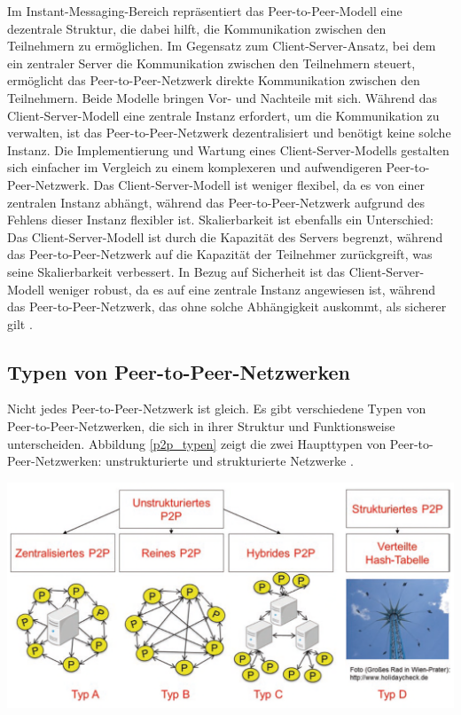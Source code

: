 Im Instant-Messaging-Bereich repräsentiert das Peer-to-Peer-Modell eine dezentrale Struktur, die dabei hilft, die Kommunikation zwischen den Teilnehmern zu ermöglichen. Im Gegensatz zum Client-Server-Ansatz, bei dem ein zentraler Server die Kommunikation zwischen den Teilnehmern steuert, ermöglicht das Peer-to-Peer-Netzwerk direkte Kommunikation zwischen den Teilnehmern. Beide Modelle bringen Vor- und Nachteile mit sich. Während das Client-Server-Modell eine zentrale Instanz erfordert, um die Kommunikation zu verwalten, ist das Peer-to-Peer-Netzwerk dezentralisiert und benötigt keine solche Instanz. Die Implementierung und Wartung eines Client-Server-Modells gestalten sich einfacher im Vergleich zu einem komplexeren und aufwendigeren Peer-to-Peer-Netzwerk. Das Client-Server-Modell ist weniger flexibel, da es von einer zentralen Instanz abhängt, während das Peer-to-Peer-Netzwerk aufgrund des Fehlens dieser Instanz flexibler ist. Skalierbarkeit ist ebenfalls ein Unterschied: Das Client-Server-Modell ist durch die Kapazität des Servers begrenzt, während das Peer-to-Peer-Netzwerk auf die Kapazität der Teilnehmer zurückgreift, was seine Skalierbarkeit verbessert. In Bezug auf Sicherheit ist das Client-Server-Modell weniger robust, da es auf eine zentrale Instanz angewiesen ist, während das Peer-to-Peer-Netzwerk, das ohne solche Abhängigkeit auskommt, als sicherer gilt \parencite[S. 6-8]{Mahlmann_P2PNetzwerke}.


\subsection{Typen von Peer-to-Peer-Netzwerken}

Nicht jedes Peer-to-Peer-Netzwerk ist gleich. Es gibt verschiedene Typen von Peer-to-Peer-Netzwerken, die sich in ihrer Struktur und Funktionsweise unterscheiden. Abbildung \ref{p2p_typen} zeigt die zwei Haupttypen von Peer-to-Peer-Netzwerken: unstrukturierte und strukturierte Netzwerke \parencite[S. 362-363]{Luntovskyy_ModRechnernetze}.

\begin{center}
    \captionsetup{type=figure}
    \includegraphics[width=1\linewidth]{images/peer_to_peer_typen.png}
    \label{p2p_typen}
\end{center}

